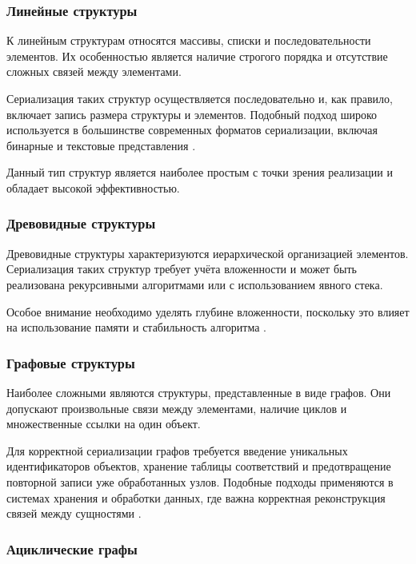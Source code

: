 \documentclass[coursework]{SCWorks}
\begin{document}
\subsubsection{Линейные структуры}

К линейным структурам относятся массивы, списки и последовательности элементов. Их особенностью является наличие строгого порядка и отсутствие сложных связей между элементами.

Сериализация таких структур осуществляется последовательно и, как правило, включает запись размера структуры и элементов. Подобный подход широко используется в большинстве современных форматов сериализации, включая бинарные и текстовые представления \cite{protobuf, avro}.

Данный тип структур является наиболее простым с точки зрения реализации и обладает высокой эффективностью.

\subsubsection{Древовидные структуры}

Древовидные структуры характеризуются иерархической организацией элементов. Сериализация таких структур требует учёта вложенности и может быть реализована рекурсивными алгоритмами или с использованием явного стека.

Особое внимание необходимо уделять глубине вложенности, поскольку это влияет на использование памяти и стабильность алгоритма \cite{stevens2013advanced, stroustrup2013cpp}.

\subsubsection{Графовые структуры}

Наиболее сложными являются структуры, представленные в виде графов. Они допускают произвольные связи между элементами, наличие циклов и множественные ссылки на один объект.

Для корректной сериализации графов требуется введение уникальных идентификаторов объектов, хранение таблицы соответствий и предотвращение повторной записи уже обработанных узлов. Подобные подходы применяются в системах хранения и обработки данных, где важна корректная реконструкция связей между сущностями \cite{evans2003domain}.

\subsubsection{Ациклические графы}
\end{document}
